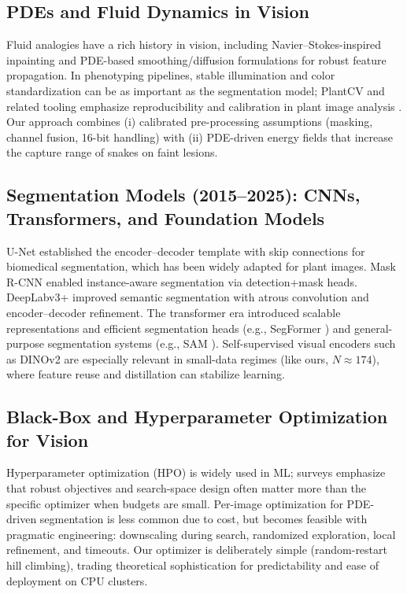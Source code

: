 \documentclass[journal]{IEEEtran}
\begin{document}
\subsection{PDEs and Fluid Dynamics in Vision}
Fluid analogies have a rich history in vision, including Navier--Stokes-inspired inpainting \cite{bertalmio2000navier} and PDE-based smoothing/diffusion formulations for robust feature propagation. In phenotyping pipelines, stable illumination and color standardization can be as important as the segmentation model; PlantCV and related tooling emphasize reproducibility and calibration in plant image analysis \cite{berry2018color,plantcv2025}. Our approach combines (i) calibrated pre-processing assumptions (masking, channel fusion, 16-bit handling) with (ii) PDE-driven energy fields that increase the capture range of snakes on faint lesions.

\subsection{Segmentation Models (2015--2025): CNNs, Transformers, and Foundation Models}
U-Net \cite{ronneberger2015u} established the encoder--decoder template with skip connections for biomedical segmentation, which has been widely adapted for plant images. Mask R-CNN \cite{he2017mask} enabled instance-aware segmentation via detection+mask heads. DeepLabv3+ \cite{chen2018deeplabv3plus} improved semantic segmentation with atrous convolution and encoder--decoder refinement. The transformer era introduced scalable representations and efficient segmentation heads (e.g., SegFormer \cite{xie2021segformer}) and general-purpose segmentation systems (e.g., SAM \cite{kirillov2023segment}). Self-supervised visual encoders such as DINOv2 \cite{oquab2023dinov2} are especially relevant in small-data regimes (like ours, $N\approx 174$), where feature reuse and distillation can stabilize learning.

\subsection{Black-Box and Hyperparameter Optimization for Vision}
Hyperparameter optimization (HPO) is widely used in ML; surveys \cite{yu2020hyperparam} emphasize that robust objectives and search-space design often matter more than the specific optimizer when budgets are small. Per-image optimization for PDE-driven segmentation is less common due to cost, but becomes feasible with pragmatic engineering: downscaling during search, randomized exploration, local refinement, and timeouts. Our optimizer is deliberately simple (random-restart hill climbing), trading theoretical sophistication for predictability and ease of deployment on CPU clusters.
\end{document}

